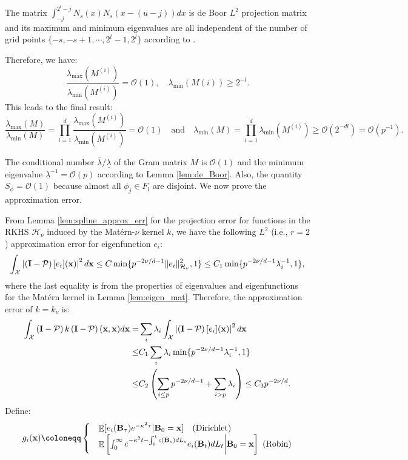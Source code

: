 \documentclass[aos,preprint]{imsart}
\theoremstyle{plain}
\DeclareMathOperator{\E}{\mathbb E}
\newcommand{\CalO}{\mathcal O}
\newcommand{\CalH}{\mathcal H}
\newcommand{\CalX}{\mathcal X}
\newcommand{\CalP}{\mathcal P}
\newcommand{\BI}{\bold I}
\newcommand{\Bx}{\bold x}
\newcommand{\BFx}{\bold x}
\newcommand{\BB}{\bold B}
\theoremstyle{remark}
\begin{document}
\begin{appendix}
The matrix $\int_{-j}^{2^l-j}N_s(x)N_s(x-(u-j))dx$ is  de Boor $L^2$ projection matrix and its maximum and minimum eigenvalues are all independent of the number of grid points $\{-s,-s+1,\cdots,2^l-1,2^l\}$ according to \cite{shadrin2001norm}. 


Therefore, we have:
\[\frac{\lambda_{\max}(M^{(i)})}{\lambda_{\min}(M^{(i)})}=\CalO(1),\quad \lambda_{\min}(M(i))\geq 2^{-l}.\]
This leads to the final result:
\[\frac{\lambda_{\max}(M)}{\lambda_{\min}(M)}=\prod_{i=1}^d \frac{\lambda_{\max}(M^{(i)})}{\lambda_{\min}(M^{(i)})}=\CalO(1)  \quad\text{and}\quad \lambda_{\min}(M)=\prod_{i=1}^d \lambda_{\min}(M^{(i)})\geq \CalO(2^{-dl})=\CalO(p^{-1} ).\]


The conditional number $\overline{\lambda}/\underline{\lambda}$ of the Gram matrix $M$ is $\CalO(1)$ and the minimum eigenvalue $\underline{\lambda}^{-1}=\CalO(p)$ according to Lemma \ref{lem:de_Boor}. Also, the quantity $S_\phi=\CalO(1)$ because almost all $\phi_j\in F_l$ are disjoint. We now prove the approximation error.

From Lemma \ref{lem:spline_approx_err} for the projection error for functions in the RKHS  $\CalH_\nu$ induced by the Mat\'ern-$\nu$ kernel $k$, we have the following $L^2$ (i.e., $r=2$) approximation error for eigenfunction $e_i$:
\begin{align*}
    \int_\CalX\left|\left(\BI-\CalP\right)[e_i](\Bx)\right|^2d\Bx\leq C\min\{p^{-{2\nu}/{d}-1}\|e_i\|_{\CalH_\nu}^2,1\}\leq C_1  \min\{p^{-{2\nu}/{d}-1}\lambda_i^{-1},1\},
\end{align*}
where the last equality is from the properties of eigenvalues and eigenfunctions for the Mat\'ern kernel in Lemma \ref{lem:eigen_mat}. Therefore,  the approximation error of $k=k_\nu$ is:
\begin{align*}
    \int_\CalX\left(\BI-\CalP\right)k\left(\BI-\CalP\right)(\Bx,\Bx)d\Bx
    =&\sum_i\lambda_i\int_\CalX\left|\left(\BI-\CalP\right)[e_i](\Bx)\right|^2d\Bx\\
    \leq & C_1\sum_i \lambda_i  \min\{p^{-{2\nu}/{d}-1}\lambda_i^{-1},1\}\\
    \leq & C_2\left(\sum_{i\leq p}  p^{-{2\nu}/{d}-1}+\sum_{i> p}  \lambda_i\right)
    \leq  C_3 p^{-2\nu/d}.
\end{align*}
Define:
\begin{equation*}
    g_i(\BFx)\coloneqq\begin{cases}
        &\E[e_i(\BB_\tau)e^{-\kappa^2\tau}|\BB_0=\Bx]\quad (\text{Dirichlet})\\
        &\E\left[\int_{0}^{\infty}e^{-\kappa^2t-\int_0^tc(\BB_s)dL_s}e_i(\BB_t)dL_t\bigg|\BB_0=\BFx\right]\ ( \text{Robin})
    \end{cases}
\end{equation*}




\end{appendix}
\end{document}

